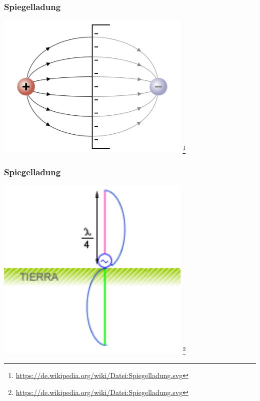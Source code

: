 \begin{frame}
    \frametitle{Spiegelladung}
    \begin{center}
        \includegraphics[width=0.7\textwidth]{e11/Spiegelladung.png}
                \footnote{\tiny \url{https://de.wikipedia.org/wiki/Datei:Spiegelladung.svg}}
	\end{center}
\end{frame}

\begin{frame}
    \frametitle{Spiegelladung}
    \begin{center}
        \includegraphics[width=0.7\textwidth]{e11/Antena_marconi501.png}
                \footnote{\tiny \url{https://de.wikipedia.org/wiki/Datei:Spiegelladung.svg}}
	\end{center}
\end{frame}

